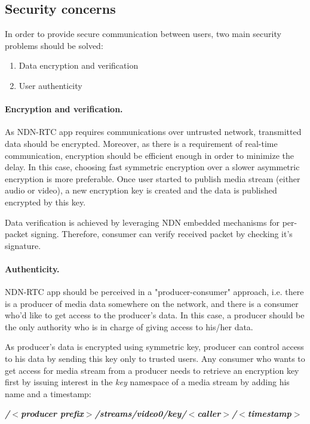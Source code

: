 \documentclass[12pt]{article}
\begin{document}
\subsection{Security concerns}
\label{security}
In order to provide secure communication between users, two main security problems should be solved:
\begin{enumerate}
\item Data encryption and verification
\item User authenticity
\end{enumerate}

\paragraph{Encryption and verification.} 

As NDN-RTC app requires communications over untrusted network, transmitted data should be encrypted. Moreover, as there is a requirement of real-time communication, encryption should be efficient enough in order to minimize the delay. In this case, choosing fast symmetric encryption over a slower asymmetric encryption is more preferable. 
Once user started to publish media stream (either audio or video), a new encryption key is created and the data is published encrypted by this key.

Data verification is achieved by leveraging NDN embedded mechanisms for per-packet signing. Therefore, consumer can verify received packet by checking it's signature.

\paragraph{Authenticity.} 

NDN-RTC app should be perceived in a "producer-consumer" approach, i.e. there is a producer of media data somewhere on the network, and there is a consumer who'd like to get access to the producer's data. In this case, a producer should be the only authority who is in charge of giving access to his/her data.

As producer's data is encrypted using symmetric key, producer can control access to his data by sending this key only to trusted users. Any consumer who wants to get access for  media stream from a producer needs to retrieve an encryption key first by issuing interest in the \textit{key} namespace of a media stream by adding his name and a timestamp:

\begin{center}
\textbf{\textit{/$<$producer prefix$>$/streams/video0/key/$<$caller$>$/$<$timestamp$>$}}
\end{center}
\end{document}
